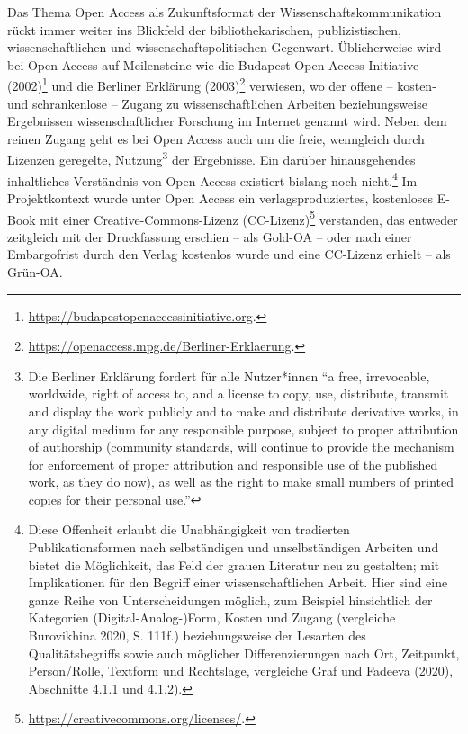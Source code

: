 \documentclass[a4paper,
fontsize=11pt,
oneside,
numbers=noperiodatend,
parskip=half-,
bibliography=totoc,
final
]{scrartcl}
\begin{document}
Das Thema Open Access als Zukunftsformat der Wissenschaftskommunikation
rückt immer weiter ins Blickfeld der bibliothekarischen,
publizistischen, wissenschaftlichen und wissenschaftspolitischen
Gegenwart. Üblicherweise wird bei Open Access auf Meilensteine wie die
Budapest Open Access Initiative (2002)\footnote{\url{https://budapestopenaccessinitiative.org}.}
und die Berliner Erklärung (2003)\footnote{\url{https://openaccess.mpg.de/Berliner-Erklaerung}.} verwiesen, wo der offene -- kosten- und
schrankenlose -- Zugang zu wissenschaftlichen Arbeiten beziehungsweise
Ergebnissen wissenschaftlicher Forschung im Internet genannt wird. Neben
dem reinen Zugang geht es bei Open Access auch um die freie, wenngleich
durch Lizenzen geregelte, Nutzung\footnote{Die Berliner Erklärung
  fordert für alle Nutzer*innen ``a free, irrevocable, worldwide, right
  of access to, and a license to copy, use, distribute, transmit and
  display the work publicly and to make and distribute derivative works,
  in any digital medium for any responsible purpose, subject to proper
  attribution of authorship (community standards, will continue to
  provide the mechanism for enforcement of proper attribution and
  responsible use of the published work, as they do now), as well as the
  right to make small numbers of printed copies for their personal
  use.''} der Ergebnisse. Ein darüber hinausgehendes inhaltliches
Verständnis von Open Access existiert bislang noch nicht.\footnote{Diese
  Offenheit erlaubt die Unabhängigkeit von tradierten Publikationsformen
  nach selbständigen und unselbständigen Arbeiten und bietet die
  Möglichkeit, das Feld der grauen Literatur neu zu gestalten; mit
  Implikationen für den Begriff einer wissenschaftlichen Arbeit. Hier
  sind eine ganze Reihe von Unterscheidungen möglich, zum Beispiel
  hinsichtlich der Kategorien (Digital-Analog-)Form, Kosten und Zugang
  (vergleiche Burovikhina 2020, S. 111f.) beziehungsweise der Lesarten
  des Qualitätsbegriffs sowie auch möglicher Differenzierungen nach Ort,
  Zeitpunkt, Person/Rolle, Textform und Rechtslage, vergleiche Graf und
  Fadeeva (2020), Abschnitte 4.1.1 und 4.1.2).} Im Projektkontext wurde
unter Open Access ein verlagsproduziertes, kostenloses E-Book mit einer
Creative-Commons-Lizenz (CC-Lizenz)\footnote{\url{https://creativecommons.org/licenses/}.}
verstanden, das entweder zeitgleich mit der Druckfassung erschien -- als
Gold-OA -- oder nach einer Embargofrist durch den Verlag kostenlos wurde
und eine CC-Lizenz erhielt -- als Grün-OA.
\end{document}
